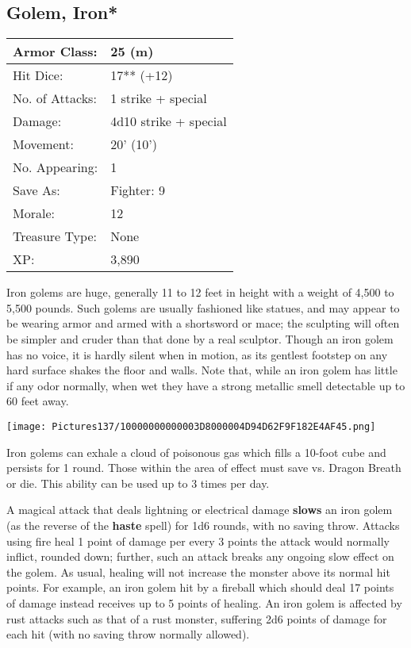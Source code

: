 \documentclass[a4paper,twoside,openany,10pt]{book}
\begin{document}
\begin{multicols}{2}
\subsection*{Golem, Iron*}\label{golem-iron}

\begin{tabularx}{0.48\textwidth}{@{}lX@{}}
Armor Class: & 25 (m) \\\hline
Hit Dice: & 17** (+12) \\\hline
No. of Attacks: & 1 strike + special \\\hline
Damage: & 4d10 strike + special \\\hline
Movement: & 20' (10') \\\hline
No. Appearing: & 1 \\\hline
Save As: & Fighter: 9 \\\hline
Morale: & 12 \\\hline
Treasure Type: & None \\\hline
XP: & 3,890 \\\hline
\end{tabularx}

Iron golems are huge, generally 11 to 12 feet in height with a weight of 4,500 to 5,500 pounds. Such golems are usually fashioned like statues, and may appear to be wearing armor and armed with a shortsword or mace; the sculpting will often be simpler and cruder than that done by a real sculptor. Though an iron golem has no voice, it is hardly silent when in motion, as its gentlest footstep on any hard surface shakes the floor and walls. Note that, while an iron golem has little if any odor normally, when wet they have a strong metallic smell detectable up to 60 feet away.

\begin{center}
	\texttt{[image: Pictures137/10000000000003D8000004D94D62F9F182E4AF45.png]}
\end{center}

Iron golems can exhale a cloud of poisonous gas which fills a 10-foot cube and persists for 1 round. Those within the area of effect must save vs. Dragon Breath or die. This ability can be used up to 3 times per day.


A magical attack that deals lightning or electrical damage \textbf{slows} an iron golem (as the reverse of the \textbf{haste} spell) for 1d6 rounds, with no saving throw. Attacks using fire heal 1 point of damage per every 3 points the attack would normally inflict, rounded down; further, such an attack breaks any ongoing slow effect on the golem. As usual, healing will not increase the monster above its normal hit points. For example, an iron golem hit by a fireball which should deal 17 points of damage instead receives up to 5 points of healing. An iron golem is affected by rust attacks such as that of a rust monster, suffering 2d6 points of damage for each hit (with no saving throw normally allowed).


\end{multicols}
\end{document}
